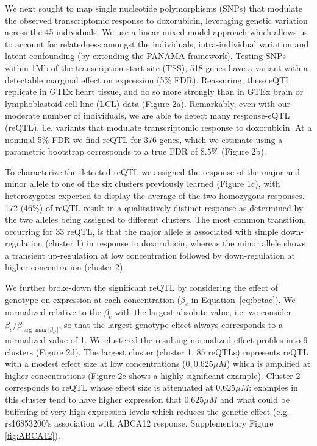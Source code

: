 \documentclass{article}
\begin{document}
{We next sought to map single nucleotide polymorphisms (SNPs) that modulate the observed transcriptomic response to doxorubicin, leveraging genetic variation across the 45 individuals. We use a linear mixed model approach which allows us to account for relatedness amongst the individuals, intra-individual variation and latent confounding (by extending the PANAMA framework\citep{Fusi2012}). Testing SNPs within 1Mb of the transcription start site (TSS), 518 genes have a variant with a detectable marginal effect on expression (5\% FDR). Reassuring, these eQTL replicate in GTEx heart tissue, and do so more strongly than in GTEx brain or lymphoblastoid cell line (LCL) data (Figure 2a). Remarkably, even with our moderate number of individuals, we are able to detect many response-eQTL (reQTL), i.e. variants that modulate transcriptomic response to doxorubicin. At a nominal 5\% FDR  we find reQTL for 376 genes, which we estimate using a parametric bootstrap corresponds to a true FDR of $8.5\%$ (Figure 2b). 

To characterize the detected reQTL we assigned the response of the major and minor allele to one of the six clusters previously learned (Figure 1c), with heterozygotes expected to display the average of the two homozygous responses. 172 (46\%) of reQTL result in a qualitatively distinct response as determined by the two alleles being assigned to different clusters. The most common transition, occurring for 33 reQTL, is that the major allele is associated with simple down-regulation (cluster 1) in response to doxorubicin, whereas the minor allele shows a transient up-regulation at low concentration followed by down-regulation at higher concentration (cluster 2). 

We further broke-down the significant reQTL by considering the effect of genotype on expression at each concentration ($\beta_c$ in Equation~\ref{eq:betac}). We normalized relative to the $\beta_c$ with the largest absolute value, i.e. we consider $\beta_c / \beta_{\arg \max{ |\beta_{c'}| }} $, so that the largest genotype effect always corresponds to a normalized value of 1. We clustered the resulting normalized effect profiles into 9 clusters (Figure 2d). The largest cluster (cluster 1, 85 reQTLs) represents reQTL with a modest effect size at low concentrations ($0,0.625\mu M$) which is amplified at higher concentrations (Figure 2e shows a highly significant example). Cluster 2 corresponds to reQTL whose effect size is attenuated at $0.625\mu M$: examples in this cluster tend to have higher expression that $0.625\mu M$ and what could be buffering of very high expression levels which reduces the genetic effect (e.g. rs16853200's association with ABCA12 response, Supplementary Figure \ref{fig:ABCA12}).

}
\end{document}
